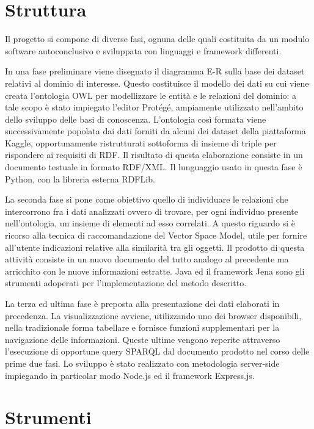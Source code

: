 \documentclass[Lau,binding=0.6cm,noexaminfo,oneside]{sapthesis}
\begin{document}
\section{Struttura}

Il progetto si compone di diverse fasi, ognuna delle quali costituita da un modulo software autoconclusivo e sviluppata con linguaggi e framework differenti.\medskip

In una fase preliminare viene disegnato il diagramma E-R sulla base dei dataset relativi al dominio di interesse. Questo costituisce il modello dei dati su cui viene creata l'ontologia OWL per modellizzare le entità e le relazioni del dominio: a tale scopo è stato impiegato l'editor Protégé, ampiamente utilizzato nell'ambito dello sviluppo delle basi di conoscenza.
L'ontologia così formata viene successivamente popolata dai dati forniti da alcuni dei dataset della piattaforma Kaggle, opportunamente ristrutturati sottoforma di insieme di triple per rispondere ai requisiti di RDF. Il risultato di questa elaborazione consiste in un documento testuale in formato RDF/XML. Il lunguaggio usato in questa fase è Python, con la libreria esterna RDFLib.\medskip

La seconda fase si pone come obiettivo quello di individuare le relazioni che intercorrono fra i dati analizzati ovvero di trovare, per ogni individuo presente nell'ontologia, un insieme di elementi ad esso correlati. A questo riguardo si è ricorso alla tecnica di raccomandazione del Vector Space Model, utile per fornire all'utente indicazioni relative alla similarità tra gli oggetti. Il prodotto di questa attività consiste in un nuovo documento del tutto analogo al precedente ma arricchito con le nuove informazioni estratte. Java ed il framework Jena sono gli strumenti adoperati per l'implementazione del metodo descritto.\medskip

La terza ed ultima fase è preposta alla presentazione dei dati elaborati in precedenza. La visualizzazione avviene, utilizzando uno dei browser disponibili, nella tradizionale forma tabellare e fornisce funzioni supplementari per la navigazione delle informazioni. Queste ultime vengono reperite attraverso l'esecuzione di opportune query SPARQL dal documento prodotto nel corso delle prime due fasi. Lo sviluppo è stato realizzato con metodologia server-side impiegando in particolar modo Node.js ed il framework Express.js.

\section{Strumenti}
\end{document}
